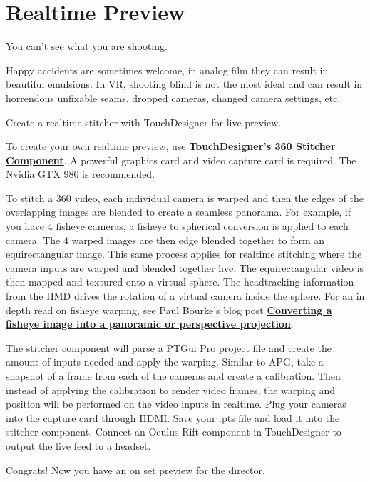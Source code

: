 \chapter{Realtime Preview}
\pagecolor{white}
\label{chap:11}
\begin{fullwidth}

\problem

{\large You can’t see what you are shooting. \par}


Happy accidents are sometimes welcome, in analog film they can result in beautiful emulsions. In VR, shooting blind is not the most ideal and can result in horrendous unfixable seams, dropped cameras, changed camera settings, etc. 


\solution

{\large Create a realtime stitcher with TouchDesigner for live preview. \par}

To create your own realtime preview, use \textbf{\href{https://www.derivative.ca/wiki088/index.php?title=Stitcher}{TouchDesigner’s 360 Stitcher Component}}. A powerful graphics card and video capture card is required. The Nvidia GTX 980 is recommended. 

To stitch a 360 video, each individual camera is warped and then the edges of the overlapping images are blended to create a seamless panorama. For example, if you have 4 fisheye cameras, a fisheye to spherical conversion is applied to each camera. The 4 warped images are then edge blended together to form an equirectangular image. This same process applies for realtime stitching where the camera inputs are warped and blended together live. The equirectangular video is then mapped and textured onto a virtual sphere. The headtracking information from the HMD drives the rotation of a virtual camera inside the sphere. For an in depth read on fisheye warping, see Paul Bourke's blog post \textbf{\href{http://paulbourke.net/dome/fish2/}{Converting a fisheye image into a panoramic or perspective projection}}.

The stitcher component will parse a PTGui Pro project file and create the amount of inputs needed and apply the warping. Similar to APG, take a snapshot of a frame from each of the cameras and create a calibration. Then instead of applying the calibration to render video frames, the warping and position will be performed on the video inputs in realtime. Plug your cameras into the capture card through HDMI. Save your .pts file and load it into the stitcher component. Connect an Oculus Rift component in TouchDesigner to output the live feed to a headset.

Congrats! Now you have an on set preview for the director.

\clearpage
\end{fullwidth}
